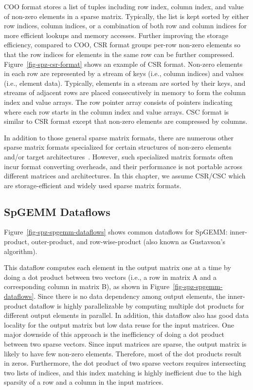 COO format stores a list of tuples including row index, column index, and value
of non-zero elements in a sparse matrix.
Typically, the list is kept sorted by either row indices, column indices, or a
combination of both row and column indices for more efficient lookups and
memory accesses.
Further improving the storage efficiency, compared to COO, CSR format groups
per-row non-zero elements so that the row indices for elements in the same row
can be further compressed.
Figure~\ref{fig-spz-csr-format} shows an example of CSR format.
Non-zero elements in each row are represented by a stream of keys (i.e., column
indices) and values (i.e., element data).
Typically, elements in a stream are sorted by their keys, and streams of
adjacent rows are placed consecutively in memory to form the column index and
value arrays.
The row pointer array consists of pointers indicating where each row starts in
the column index and value arrays.
CSC format is similar to CSR format except that non-zero elements are
compressed by columns.

In addition to those general sparse matrix formats, there are numerous
other sparse matrix formats specialized for certain structures of non-zero
elements and/or
target architectures~\cite{borvstnik-dbcsr-2014,hu-graphlily-iccad2021,gomez-spmv-vector-2021,srivastava-matraptor-micro2020,chen-spgemm-taihulight-2018}.
However, such specialized matrix formats often incur format converting
overheads, and their performance is not portable across different matrices and
architectures.
In this chapter, we assume CSR/CSC which are storage-efficient and widely used
sparse matrix formats.



\subsection{SpGEMM Dataflows}

Figure~\ref{fig-spz-spgemm-dataflows} shows common dataflows for SpGEMM:
inner-product, outer-product, and row-wise-product (also known as Gustavson's
algorithm).

This dataflow computes each element in the output matrix one at a time by doing
a dot product between two vectors (i.e., a row in matrix A and a corresponding
column in matrix B), as shown in Figure~\ref{fig-spz-spgemm-dataflows}.
Since there is no data dependency among output elements, the inner-product
dataflow is highly parallelizable by computing multiple dot products for
different output elements in parallel.
In addition, this dataflow also has good data locality for the output matrix
but low data reuse for the input matrices.
One major downside of this approach is the inefficiency of doing a dot product
between two sparse vectors.
Since input matrices are sparse, the output matrix is likely to have few
non-zero elements.
Therefore, most of the dot products result in zeros.
Furthermore, the dot product of two sparse vectors requires intersecting two
lists of indices, and this index matching is highly inefficient due to the high
sparsity of a row and a column in the input matrices.

